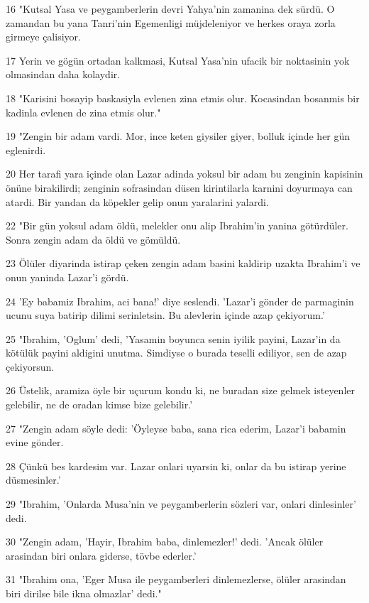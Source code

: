\par 16 "Kutsal Yasa ve peygamberlerin devri Yahya'nin zamanina dek sürdü. O zamandan bu yana Tanri'nin Egemenligi müjdeleniyor ve herkes oraya zorla girmeye çalisiyor.
\par 17 Yerin ve gögün ortadan kalkmasi, Kutsal Yasa'nin ufacik bir noktasinin yok olmasindan daha kolaydir.
\par 18 "Karisini bosayip baskasiyla evlenen zina etmis olur. Kocasindan bosanmis bir kadinla evlenen de zina etmis olur."
\par 19 "Zengin bir adam vardi. Mor, ince keten giysiler giyer, bolluk içinde her gün eglenirdi.
\par 20 Her tarafi yara içinde olan Lazar adinda yoksul bir adam bu zenginin kapisinin önüne birakilirdi; zenginin sofrasindan düsen kirintilarla karnini doyurmaya can atardi. Bir yandan da köpekler gelip onun yaralarini yalardi.
\par 22 "Bir gün yoksul adam öldü, melekler onu alip Ibrahim'in yanina götürdüler. Sonra zengin adam da öldü ve gömüldü.
\par 23 Ölüler diyarinda istirap çeken zengin adam basini kaldirip uzakta Ibrahim'i ve onun yaninda Lazar'i gördü.
\par 24 'Ey babamiz Ibrahim, aci bana!' diye seslendi. 'Lazar'i gönder de parmaginin ucunu suya batirip dilimi serinletsin. Bu alevlerin içinde azap çekiyorum.'
\par 25 "Ibrahim, 'Oglum' dedi, 'Yasamin boyunca senin iyilik payini, Lazar'in da kötülük payini aldigini unutma. Simdiyse o burada teselli ediliyor, sen de azap çekiyorsun.
\par 26 Üstelik, aramiza öyle bir uçurum kondu ki, ne buradan size gelmek isteyenler gelebilir, ne de oradan kimse bize gelebilir.'
\par 27 "Zengin adam söyle dedi: 'Öyleyse baba, sana rica ederim, Lazar'i babamin evine gönder.
\par 28 Çünkü bes kardesim var. Lazar onlari uyarsin ki, onlar da bu istirap yerine düsmesinler.'
\par 29 "Ibrahim, 'Onlarda Musa'nin ve peygamberlerin sözleri var, onlari dinlesinler' dedi.
\par 30 "Zengin adam, 'Hayir, Ibrahim baba, dinlemezler!' dedi. 'Ancak ölüler arasindan biri onlara giderse, tövbe ederler.'
\par 31 "Ibrahim ona, 'Eger Musa ile peygamberleri dinlemezlerse, ölüler arasindan biri dirilse bile ikna olmazlar' dedi."

